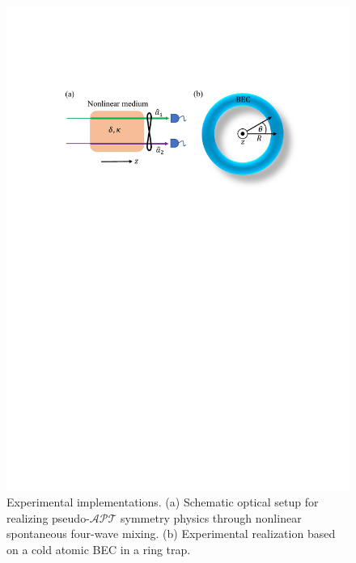 \documentclass[twocolumn,prl,floatfix,citeautoscript,nofootinbib,superscriptaddress]{revtex4}
\begin{document}
\begin{figure}[t]
\includegraphics[width=1.0\linewidth]{Fig3.pdf}
\caption{Experimental implementations. (a) Schematic optical setup for
realizing pseudo-$\mathcal{APT}$ symmetry physics through nonlinear
spontaneous four-wave mixing. (b) Experimental realization based on a cold
atomic BEC in a ring trap.}
\label{fig:3}
\end{figure}
\end{document}
